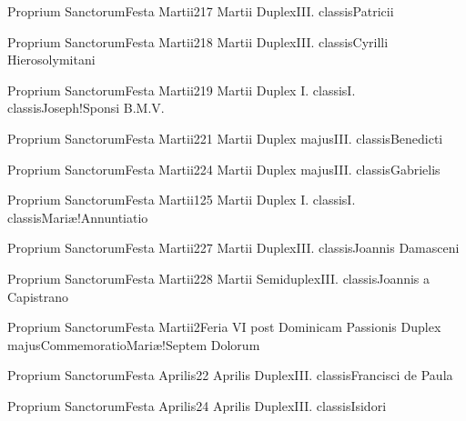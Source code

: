 \documentclass[invitatoriale-romanum.tex]{subfiles}
\begin{document}
	{Proprium Sanctorum}{Festa Martii}{2}{17 Martii}
	{Duplex}{III. classis}{Patricii}
	{}
	{}

	{Proprium Sanctorum}{Festa Martii}{2}{18 Martii}
	{Duplex}{III. classis}{Cyrilli Hierosolymitani}
	{}
	{}

	{Proprium Sanctorum}{Festa Martii}{2}{19 Martii}
	{Duplex I. classis}{I. classis}{Joseph!Sponsi B.M.V.}
	{}
	{}

	{Proprium Sanctorum}{Festa Martii}{2}{21 Martii}
	{Duplex majus}{III. classis}{Benedicti}
	{}
	{}

	{Proprium Sanctorum}{Festa Martii}{2}{24 Martii}
	{Duplex majus}{III. classis}{Gabrielis}
	{}
	{}

	{Proprium Sanctorum}{Festa Martii}{1}{25 Martii}
	{Duplex I. classis}{I. classis}{Mariæ!Annuntiatio}
	{}
	{}

	{Proprium Sanctorum}{Festa Martii}{2}{27 Martii}
	{Duplex}{III. classis}{Joannis Damasceni}
	{}
	{}

	{Proprium Sanctorum}{Festa Martii}{2}{28 Martii}
	{Semiduplex}{III. classis}{Joannis a Capistrano}
	{}
	{}

	{Proprium Sanctorum}{Festa Martii}{2}{Feria VI post Dominicam Passionis}
	{Duplex majus}{Commemoratio}{Mariæ!Septem Dolorum}
	{}
	{\invitferia}


	{Proprium Sanctorum}{Festa Aprilis}{2}{2 Aprilis}
	{Duplex}{III. classis}{Francisci de Paula}
	{}
	{}

	{Proprium Sanctorum}{Festa Aprilis}{2}{4 Aprilis}
	{Duplex}{III. classis}{Isidori}
	{}
	{}
\end{document}
